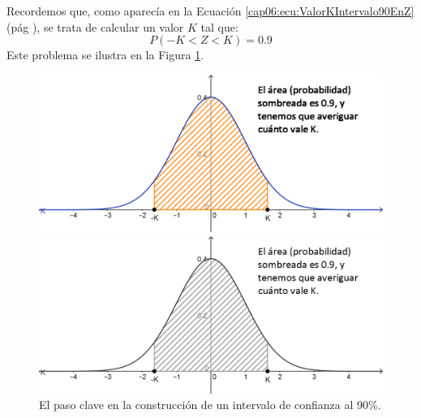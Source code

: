 Recordemos que, como aparecía en la Ecuación
\ref{cap06:ecu:ValorKIntervalo90EnZ} (pág
\pageref{cap06:ecu:ValorKIntervalo90EnZ}), se trata de calcular un valor $K$
tal que:
\[P(-K< Z <K)=0.9\]
Este problema se ilustra en la Figura
\ref{cap06:fig:ProblemaInversoZIntervalo90}.

\begin{figure}[h!]
\begin{center}
\begin{enColor}
\includegraphics[width=13cm]{../fig/Cap06-ProblemaInversoZ-02.png}
\end{enColor}
\begin{bn}
\includegraphics[width=13cm]{../fig/Cap06-ProblemaInversoZ-02-bn.png}
\end{bn}
\caption{El paso clave en la construcción de un intervalo de confianza al 90\%.}
\label{cap06:fig:ProblemaInversoZIntervalo90}
\end{center}
\end{figure}
%

